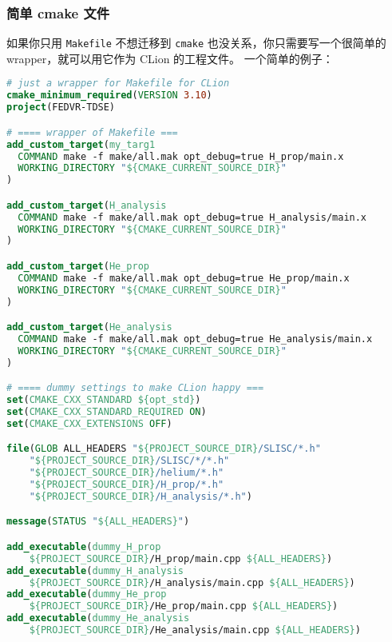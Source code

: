
\begin{issues}
\issueDraft
\end{issues}

\subsubsection{简单 cmake 文件}
如果你只用 \verb|Makefile| 不想迁移到 \verb|cmake| 也没关系，你只需要写一个很简单的 wrapper，就可以用它作为 CLion 的工程文件。 一个简单的例子：
\begin{lstlisting}[language=cmake]
# just a wrapper for Makefile for CLion
cmake_minimum_required(VERSION 3.10)
project(FEDVR-TDSE)

# ==== wrapper of Makefile ===
add_custom_target(my_targ1
  COMMAND make -f make/all.mak opt_debug=true H_prop/main.x
  WORKING_DIRECTORY "${CMAKE_CURRENT_SOURCE_DIR}"
)

add_custom_target(H_analysis
  COMMAND make -f make/all.mak opt_debug=true H_analysis/main.x
  WORKING_DIRECTORY "${CMAKE_CURRENT_SOURCE_DIR}"
)

add_custom_target(He_prop
  COMMAND make -f make/all.mak opt_debug=true He_prop/main.x
  WORKING_DIRECTORY "${CMAKE_CURRENT_SOURCE_DIR}"
)

add_custom_target(He_analysis
  COMMAND make -f make/all.mak opt_debug=true He_analysis/main.x
  WORKING_DIRECTORY "${CMAKE_CURRENT_SOURCE_DIR}"
)

# ==== dummy settings to make CLion happy ===
set(CMAKE_CXX_STANDARD ${opt_std})
set(CMAKE_CXX_STANDARD_REQUIRED ON)
set(CMAKE_CXX_EXTENSIONS OFF)

file(GLOB ALL_HEADERS "${PROJECT_SOURCE_DIR}/SLISC/*.h"
    "${PROJECT_SOURCE_DIR}/SLISC/*/*.h"
    "${PROJECT_SOURCE_DIR}/helium/*.h"
    "${PROJECT_SOURCE_DIR}/H_prop/*.h"
    "${PROJECT_SOURCE_DIR}/H_analysis/*.h")

message(STATUS "${ALL_HEADERS}")

add_executable(dummy_H_prop
    ${PROJECT_SOURCE_DIR}/H_prop/main.cpp ${ALL_HEADERS})
add_executable(dummy_H_analysis
    ${PROJECT_SOURCE_DIR}/H_analysis/main.cpp ${ALL_HEADERS})
add_executable(dummy_He_prop
    ${PROJECT_SOURCE_DIR}/He_prop/main.cpp ${ALL_HEADERS})
add_executable(dummy_He_analysis
    ${PROJECT_SOURCE_DIR}/He_analysis/main.cpp ${ALL_HEADERS})
\end{lstlisting}

